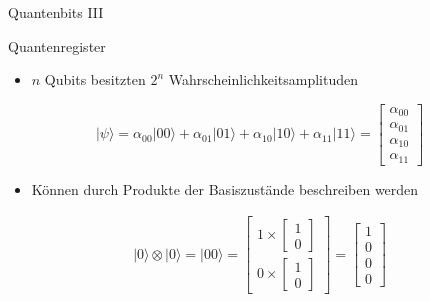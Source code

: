 \documentclass[compress,aspectratio=1610]{beamer}
\begin{document}
\begin{frame}{Quantenbits III}
  \begin{block}{Quantenregister}
    \begin{itemize}
    \item $n$ Qubits besitzten $2^n$ Wahrscheinlichkeitsamplituden 
    \end{itemize}
    \begin{equation}\nonumber
      |\psi \rangle = \alpha_{00} |00\rangle + \alpha_{01} |01\rangle + \alpha_{10} |10\rangle + \alpha_{11} |11\rangle = \begin{bmatrix} \alpha_{00} \\ \alpha_{01} \\ \alpha_{10} \\ \alpha_{11} \end{bmatrix}
    \end{equation}
    \begin{itemize}
    \item K\"onnen durch Produkte der Basiszust\"ande beschreiben werden
    \end{itemize}
    
    \begin{equation}\nonumber
      \begin{aligned}
        |0\rangle\otimes |0\rangle = |00\rangle = \begin{bmatrix}1 \times \begin{bmatrix} 1\\0\end{bmatrix}\\[1em] 0 \times \begin{bmatrix} 1\\0\end{bmatrix}\end{bmatrix} = \begin{bmatrix} 1 \\ 0 \\ 0 \\ 0\end{bmatrix}
      \end{aligned}
    \end{equation}
  \end{block}
\end{frame}
\end{document}
